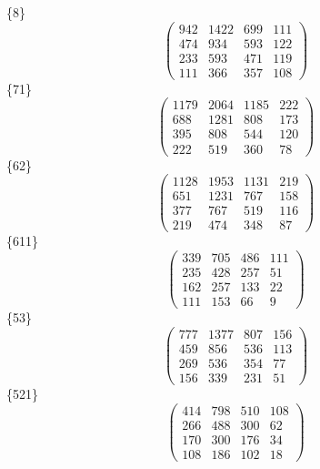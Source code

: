 \documentclass[12pt,reqno]{amsart}
\begin{document}
\Large
\{8\}                             $$ \begin{pmatrix} 
                      942 & 1422 & 699 & 111 \\[6pt]
                       474 & 934 & 593 & 122 \\[6pt]
                       233 & 593 & 471 & 119 \\[6pt]
                         111 & 366 & 357 & 108
                              \end{pmatrix} $$ 
\{71\}                             $$ \begin{pmatrix} 
                     1179 & 2064 & 1185 & 222 \\[6pt]
                      688 & 1281 & 808 & 173 \\[6pt]
                       395 & 808 & 544 & 120 \\[6pt]
                         222 & 519 & 360 & 78
                              \end{pmatrix} $$ 
\{62\}                             $$ \begin{pmatrix} 
                     1128 & 1953 & 1131 & 219 \\[6pt]
                      651 & 1231 & 767 & 158 \\[6pt]
                       377 & 767 & 519 & 116 \\[6pt]
                         219 & 474 & 348 & 87
                              \end{pmatrix} $$ 
\{611\}                             $$ \begin{pmatrix} 
                       339 & 705 & 486 & 111 \\[6pt]
                       235 & 428 & 257 & 51 \\[6pt]
                       162 & 257 & 133 & 22 \\[6pt]
                          111 & 153 & 66 & 9
                              \end{pmatrix} $$ 
\{53\}                             $$ \begin{pmatrix} 
                      777 & 1377 & 807 & 156 \\[6pt]
                       459 & 856 & 536 & 113 \\[6pt]
                       269 & 536 & 354 & 77 \\[6pt]
                         156 & 339 & 231 & 51
                              \end{pmatrix} $$ 
\{521\}                             $$ \begin{pmatrix} 
                       414 & 798 & 510 & 108 \\[6pt]
                       266 & 488 & 300 & 62 \\[6pt]
                       170 & 300 & 176 & 34 \\[6pt]
                         108 & 186 & 102 & 18
                              \end{pmatrix} $$ 
\end{document}
